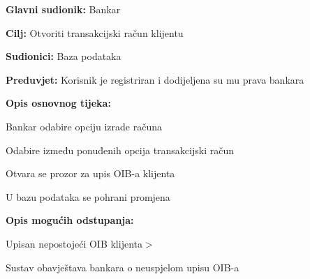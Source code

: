             \noindent {}
            \begin{packed_item}
            
              \item \textbf{Glavni sudionik: }Bankar
              \item  \textbf{Cilj:} Otvoriti transakcijski račun klijentu
              \item  \textbf{Sudionici:} Baza podataka
              \item  \textbf{Preduvjet:} Korisnik je registriran i dodijeljena su mu prava bankara
              \item  \textbf{Opis osnovnog tijeka:}
              
              \item[] \begin{packed_enum}
            
                \item Bankar odabire opciju izrade računa 
                \item Odabire između ponuđenih opcija transakcijski račun
                \item Otvara se prozor za upis OIB-a klijenta 
                \item U bazu podataka se pohrani promjena 
              \end{packed_enum}
              
              \item  \textbf{Opis mogućih odstupanja:}
              
              \item[] \begin{packed_item}
            
                \item[3.a] Upisan nepostojeći OIB klijenta$>$
                \item[] \begin{packed_enum}
                  
                  \item Sustav obavještava bankara o neuspjelom upisu OIB-a 
                  
                \end{packed_enum}
                
              \end{packed_item}
            \end{packed_item}
            
